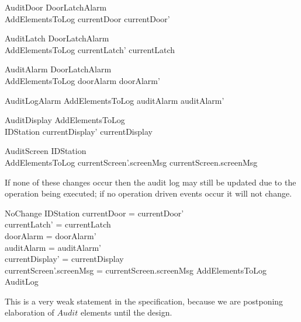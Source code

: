 \begin{schema}{AuditDoor}
        \Delta DoorLatchAlarm
\\        AddElementsToLog
\where
        currentDoor \neq currentDoor'
\end{schema}

\begin{schema}{AuditLatch}
        \Delta DoorLatchAlarm
\\        AddElementsToLog
\where
        currentLatch' \neq currentLatch 
\end{schema}

\begin{schema}{AuditAlarm}
        \Delta DoorLatchAlarm
\\      AddElementsToLog
\where
        doorAlarm \neq doorAlarm' 
\also
\end{schema}

\begin{schema}{AuditLogAlarm}
        AddElementsToLog
\where
        auditAlarm \neq auditAlarm'
\end{schema}

\begin{schema}{AuditDisplay}
        AddElementsToLog
\\      \Delta IDStation 
\where
        currentDisplay' \neq currentDisplay
\end{schema}

\begin{schema}{AuditScreen}
        \Delta IDStation 
\\      AddElementsToLog
\where
        currentScreen'.screenMsg \neq currentScreen.screenMsg 
\end{schema}

If none of these changes occur then the audit log may still be updated due
to the operation being executed; if no operation driven events
occur it will not change.

\begin{schema}{NoChange}
      \Delta IDStation
\where
        currentDoor = currentDoor'
\\      currentLatch' = currentLatch 
\\      doorAlarm = doorAlarm' 
\\      auditAlarm = auditAlarm'
\\      currentDisplay' = currentDisplay
\\      currentScreen'.screenMsg = currentScreen.screenMsg 
\also
        AddElementsToLog \lor \Xi AuditLog
\end{schema}
\begin{Zcomment}
\item
This is a very weak statement in the specification, because we are
postponing elaboration of $Audit$ elements until the design.
\end{Zcomment}


